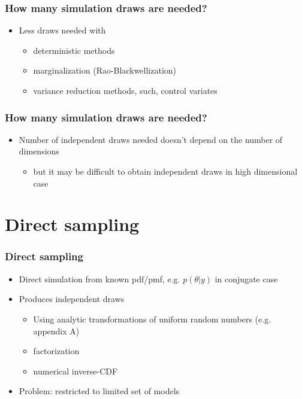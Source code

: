 \documentclass[10pt]{beamer}
\begin{document}
\begin{frame}

\frametitle{How many simulation draws are needed?}

  \begin{itemize}
  \item Less draws needed with
    \begin{itemize}
    \item deterministic methods
    \item marginalization (Rao-Blackwellization)
    \item variance reduction methods, such, control variates
    \end{itemize}
  \end{itemize}

\end{frame}

\begin{frame}

\frametitle{How many simulation draws are needed?}

  \begin{itemize}
  \item Number of independent draws needed doesn't depend on the number of dimensions
    \begin{itemize}
    \item but it may be difficult to obtain independent draws in high dimensional case
    \end{itemize}
  \end{itemize}

\end{frame}


\section{Direct sampling}
\frame{\sectionpage}

\begin{frame}
\frametitle{Direct sampling}

  \begin{itemize}
  \item Direct simulation from known pdf/pmf, e.g. $p(\theta|y)$ in conjugate case
  \item Produces independent draws
    \begin{itemize}
    \item Using analytic transformations of uniform random numbers
      (e.g. appendix A)
    \item factorization
    \item numerical inverse-CDF
    \end{itemize}
  \item {\color{uured} Problem}: restricted to limited set of models
  \end{itemize}

\end{frame}
\end{document}
